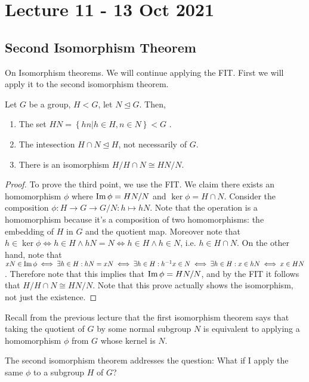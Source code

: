 \section{Lecture 11 - 13 Oct 2021}
\subsection{Second Isomorphism Theorem}
On Isomorphism theorems. We will continue applying the FIT. First we will apply it to the
second isomorphism theorem.
\begin{theorem}
  Let $G$ be a group, $H<G$, let $N\trianglelefteq G$. Then,
  \begin{enumerate}
    \item The set $HN=\left\{ hn |h\in H,n\in N \right\} <G$ .
    \item The intesection $H\cap N \trianglelefteq H$, not necessarily of $G$.
    \item There is an isomorphism $H/H\cap N \cong HN/N$.
  \end{enumerate}
  \label{secondIso}
\end{theorem}
\begin{proof}
  To prove the third point, we use the FIT. We claim there exists an homomorphism $\phi$
  where $\operatorname{Im}\phi= HN/N$ and $\ker\phi = H\cap N$. Consider the composition $\phi:H\to
  G\to G/N: h\mapsto hN$. Note that the operation is a homomorphism because it's a
  composition of two homomorphisms: the embedding of $H$ in $G$ and the quotient map.
  Moreover note that $h\in\ker\phi \iff h\in H \land hN=N \iff h\in H \land h\in N$, i.e.
  $h\in H\cap N$. On the other hand, note that $xN\in\operatorname{Im}\phi \iff \exists h\in H : hN=xN
  \iff \exists h\in H : h^{-1}x\in N \iff \exists h\in H : x\in hN \iff x\in HN$.
  Therefore note that this implies that $\operatorname{Im}\phi = HN/N$, and by the FIT it follows
  that $H/H\cap N \cong HN/N$. Note that this prove actually shows the isomorphism, not
  just the existence.
\end{proof}
Recall from the previous lecture that the first isomorphism theorem says that taking the
quotient of $G$ by some normal subgroup $N$ is equivalent to applying a homomorphism $\phi$
from $G$ whose kernel is $N$.

The second isomorphism theorem addresses the question: What if I apply the same $\phi$ to
a subgroup $H$ of $G$? 

